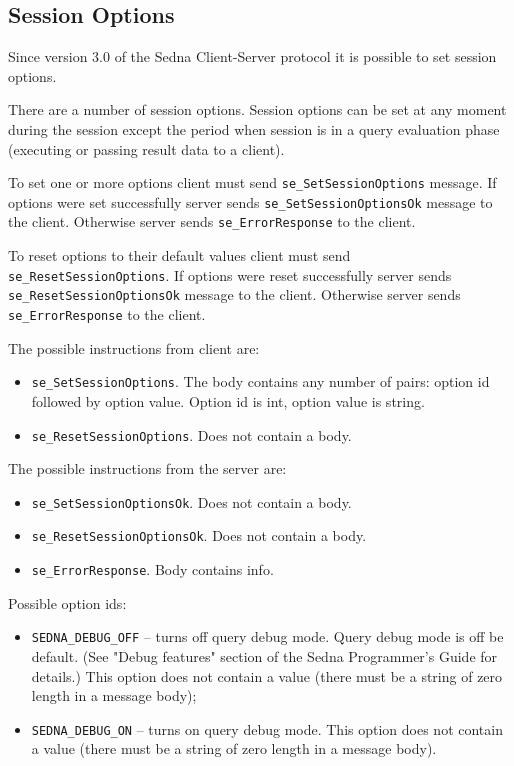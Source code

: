 \documentclass[a4paper,12pt]{article}
\newenvironment{citemize}
{\begin{itemize}
  \setlength{\itemsep}{0pt}
  \setlength{\parskip}{0pt}
  \setlength{\parsep}{0pt}}
{\end{itemize}}
\begin{document}
\subsection{Session Options}

Since version 3.0 of the Sedna Client-Server protocol it is possible to set
session options.

There are a number of session options. Session options can be set at any moment
during the session except the period when session is in a query evaluation phase
(executing or passing result data to a client).

To set one or more options client must send \verb!se_SetSessionOptions! message.
If options were set successfully server sends \verb!se_SetSessionOptionsOk!
message to the client. Otherwise server sends \verb!se_ErrorResponse! to the
client.

To reset options to their default values client must send
\verb!se_ResetSessionOptions!. If options were reset successfully server sends
\verb!se_ResetSessionOptionsOk! message to the client. Otherwise server sends
\verb!se_ErrorResponse! to the client.

The possible instructions from client are:
\begin{citemize}
\item \verb!se_SetSessionOptions!. The body contains any number of pairs: option
id followed by option value. Option id is int, option value is string.
\item \verb!se_ResetSessionOptions!. Does not contain a body.
\end{citemize}

The possible instructions from the server are:
\begin{citemize}
\item \verb!se_SetSessionOptionsOk!. Does not contain a body.
\item \verb!se_ResetSessionOptionsOk!. Does not contain a body.
\item \verb!se_ErrorResponse!. Body contains info.
\end{citemize}

Possible option ids:
\begin{citemize}
\item \verb!SEDNA_DEBUG_OFF! -- turns off query debug mode. Query debug mode is
off be default. (See "Debug features" section of the Sedna Programmer's Guide
for details.) This option does not contain a value (there must be a string of
zero length in a message body);
\item \verb!SEDNA_DEBUG_ON! -- turns on query debug mode. This option does not
contain a value (there must be a string of zero length in a message body).
\end{citemize}
\end{document}
